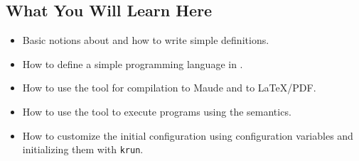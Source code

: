 \begin{latexComment}
\section{What You Will Learn Here}

\begin{itemize}
\item Basic notions about \K and how to write simple \K definitions.
\item How to define a simple programming language in \K.
\item How to use the \K tool for compilation to Maude and to \LaTeX/PDF.
\item How to use the \K tool to execute programs using the semantics.
\item How to customize the initial configuration using configuration
variables and initializing them with \texttt{krun}.
\end{itemize}

\end{latexComment}

\vspace*{3ex}
